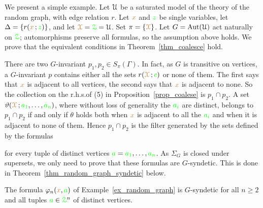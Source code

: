 \begin{example}\label{ex_random_graph}
  We present a simple example.
  Let $\EuScript U$ be a saturated model of the theory of the random graph, with edge relation $r$.
  Let ${\color{brown} x}$ and ${\color{green} z}$ be single variables, let $\Delta=\{r({\color{brown} x}\,;{\color{green} z})\}$, and let ${\color{brown}\EuScript X}={\color{green}\EuScript Z}=\EuScript U$.
  Set $\pi=\{{\color{brown}\EuScript X}\}$.
  Let $G={\rm Aut}(\EuScript U)$ act naturally on ${\color{green}\EuScript Z}$; automorphisms preserve all formulas, so the assumption above holds.
  We prove that the equivalent conditions in Theorem~\ref{thm_coalesce} hold.

  There are two $G$-invariant $p_1,p_2\in S_\pi(\Gamma)$.
  In fact, as $G$ is transitive on vertices, a $G$-invariant $p$ contains either all the sets $r({\color{brown}\EuScript X}\,;{\color{green} c})$ or none of them.
  The first says that ${\color{brown} x}$ is adjacent to all vertices, the second says that ${\color{brown} x}$ is adjacent to none.
  So the collection on the r.h.s.\@ of (5) in Proposition~\ref{prop_coalese} is $p_1\cap p_2$.
  A set $\vartheta({\color{brown}\EuScript X}\,;{\color{green} a_1},\dots,{\color{green} a_n})$, where without loss of generality the ${\color{green} a_i}$ are distinct, belongs to $p_1\cap p_2$ if and only if $\theta$ holds both when ${\color{brown} x}$ is adjacent to all the ${\color{green} a_i}$ and when it is adjacent to none of them.
  Hence $p_1\cap p_2$ is the filter generated by the sets defined by the formulas


  for every tuple of distinct vertices ${\color{green} a}={\color{green} a_1},\dots,{\color{green} a_n}$.
  As $\Sigma_G$ is closed under supersets, we only need to prove that these formulas are $G$-syndetic.
  This is done in Theorem~\ref{thm_random_graph_syndetic} below.
\end{example}

\begin{theorem}\label{thm_random_graph_syndetic}
  The formula $\varphi_n({\color{brown} x},{\color{green} a})$ of Example~\ref{ex_random_graph} is $G$-syndetic for all $n\ge 2$ and all tuples ${\color{green} a}\in{\color{green}\EuScript Z}^n$ of distinct vertices.
\end{theorem}

